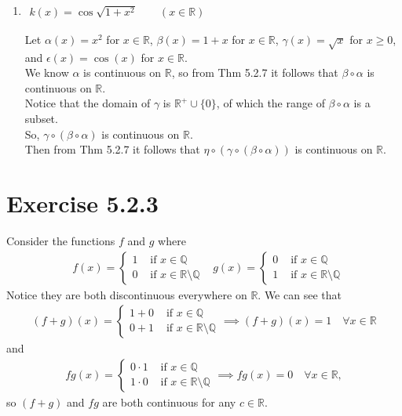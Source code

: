 \documentclass[11pt]{article}
\newcommand{\R}{\mathbb{R}}  %
\newcommand{\Q}{\mathbb{Q}}  %
\begin{document}
\begin{enumerate}[label=(\alph*)]
    \item $\begin{aligned} k(x)=\cos\sqrt{1+x^2} \qquad (x\in\R)\end{aligned}$

    Let $\alpha(x)=x^2$ for $x\in\R$, $\beta(x)=1+x$ for $x\in\R$, $\gamma(x)=\sqrt{x}$ for $x\geq 0$, and $\epsilon(x)=\cos(x)$ for $x\in\R$. \\
    We know $\alpha$ is continuous on $\R$, so from Thm 5.2.7 it follows that $\beta\circ\alpha$ is continuous on $\R$. \\
    Notice that the domain of $\gamma$ is $\R^+\cup\{0\}$, of which the range of $\beta\circ\alpha$ is a subset. \\
    So, $\gamma\circ(\beta\circ\alpha)$ is continuous on $\R$. \\
    Then from Thm 5.2.7 it follows that $\eta\circ(\gamma\circ(\beta\circ\alpha))$ is continuous on $\R$.
\end{enumerate}

\section*{Exercise 5.2.3}\vspace{-1em}
    Consider the functions $f$ and $g$ where
    \begin{align}
        &f(x)=\begin{cases}
            1 & \text{ if } x\in\Q \\
            0 & \text{ if } x\in\R\setminus\Q
        \end{cases}
        &g(x)=\begin{cases}
            0 & \text{ if } x\in\Q \\
            1 & \text{ if } x\in\R\setminus\Q
        \end{cases}
    \end{align}
    Notice they are both discontinuous everywhere on $\R$. We can see that
    \begin{align}
        (f+g)(x)=\begin{cases}
            1+0 & \text{ if } x\in\Q \\
            0+1 & \text{ if } x\in\R\setminus\Q
        \end{cases} \implies (f+g)(x)=1 \quad \forall x\in\R
    \end{align}
    and
    \begin{align}
        fg(x)=\begin{cases}
            0\cdot 1 & \text{ if } x\in\Q \\
            1\cdot 0 & \text{ if } x\in\R\setminus\Q
        \end{cases} \implies fg(x)=0 \quad \forall x\in\R,
    \end{align}
    so $(f+g)$ and $fg$ are both continuous for any $c\in\R$.
    \vspace{-1em}
\end{document}
